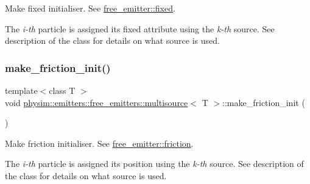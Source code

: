 Make fixed initialiser. See \hyperlink{classphysim_1_1emitters_1_1free__emitter_a2561dbe073b699e28fbb7ad10e897567}{free\+\_\+emitter\+::fixed}. 

The {\itshape i-\/th} particle is assigned its \textquotesingle{}fixed\textquotesingle{} attribute using the {\itshape k-\/th} source. See description of the class for details on what source is used. \mbox{\label{classphysim_1_1emitters_1_1free__emitters_1_1multisource_ad179c7246d3fe615e327fb9866570f6f}} 
\subsubsection{\texorpdfstring{make\+\_\+friction\+\_\+init()}{make\_friction\_init()}}
{\footnotesize\ttfamily template$<$class T $>$ \\
void \hyperlink{classphysim_1_1emitters_1_1free__emitters_1_1multisource}{physim\+::emitters\+::free\+\_\+emitters\+::multisource}$<$ T $>$\+::make\+\_\+friction\+\_\+init (\begin{DoxyParamCaption}{ }\end{DoxyParamCaption})}



Make friction initialiser. See \hyperlink{classphysim_1_1emitters_1_1free__emitter_a0167889dfac9483e7e2690efc353a7bd}{free\+\_\+emitter\+::friction}. 

The {\itshape i-\/th} particle is assigned its position using the {\itshape k-\/th} source. See description of the class for details on what source is used. \mbox{\label{classphysim_1_1emitters_1_1free__emitters_1_1multisource_a98060cb2539012355cab5179086b1535}} 
